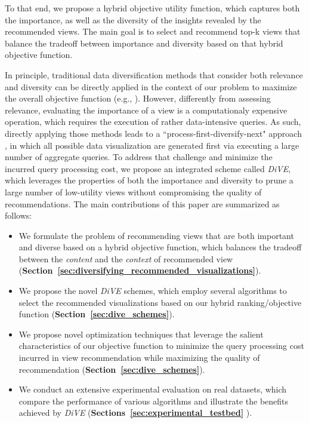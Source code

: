To that end, we propose a hybrid objective utility function, which captures both the importance, as well as the diversity of the insights revealed by the recommended views.
%
The main goal is to select and recommend top-k views that balance the tradeoff between importance and diversity based on that hybrid objective function. 
%

In principle, traditional data diversification methods that consider both relevance and diversity can be directly applied in the context of our problem to maximize the overall objective function (e.g., \cite{Zhang2008,Rafiei2010,Yu2009}).
%
%
However, differently from assessing  relevance, evaluating the importance of a view is a computationaly expensive operation, which requires the execution of rather data-intensive queries. 
%
As such, directly applying those methods leads to a ``process-first-diversify-next" approach \cite{Zhang2008,Rafiei2010}, in which all possible data visualization are generated first via executing a large number of aggregate queries. 
%
To address that challenge and minimize the incurred query processing cost, we propose an integrated scheme called {\em DiVE}, which leverages the properties of both the importance and diversity to prune a large number of low-utility views without compromising the quality of recommendations. 
%
The main contributions of this paper are summarized as follows:

\begin{itemize}

	\item We formulate the problem of recommending views that are both important and diverse based on a hybrid objective function, which balances the tradeoff between the {\em content} and the {\em context} of recommended view ({\bf Section~\ref{sec:diversifying_recommended_visualizations}}). 
		
	\item We propose the novel \textit{DiVE} schemes, which employ several algorithms to select the recommended visualizations based on our hybrid ranking/objective function ({\bf Section~\ref{sec:dive_schemes}}).
	
	\item We propose novel optimization techniques that leverage the salient characteristics of our objective function to minimize the query processing cost incurred in view recommendation while maximizing the quality of recommendation ({\bf Section~\ref{sec:dive_schemes}}).
	
	\item We conduct an extensive experimental evaluation on real datasets, which compare the performance of various algorithms and illustrate the benefits achieved by \textit{DiVE} ({\bf Sections~\ref{sec:experimental_testbed} }). 
\end{itemize}


